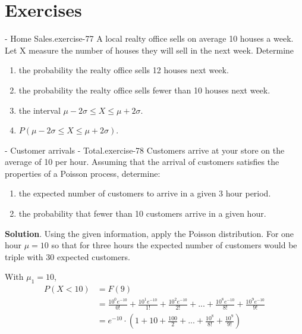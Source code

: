 \documentclass[10pt,]{book}
\numberwithin{equation}{section}
\newcommand{\lt}{<}
\begin{document}
\section[{Exercises}]{Exercises}\label{section-56}
\hypertarget{p-1162}{}%
\begin{inlineexercise}{- Home Sales.}{exercise-77}%
\hypertarget{p-1163}{}%
A local realty office sells on average 10 houses a week.  Let X measure the number of houses they will sell in the next week.  Determine \leavevmode%
\begin{enumerate}
\item\hypertarget{li-296}{}the probability the realty office sells 12 houses next week.%
\item\hypertarget{li-297}{}the probability the realty office sells fewer than 10 houses next week.%
\item\hypertarget{li-298}{}the interval \(\mu - 2\sigma \le X \le \mu + 2\sigma\).%
\item\hypertarget{li-299}{}\(P(\mu - 2\sigma \le X \le \mu + 2\sigma)\).%
\end{enumerate}
%
\end{inlineexercise}
%
\par
\hypertarget{p-1164}{}%
\begin{inlineexercise}{- Customer arrivals - Total.}{exercise-78}%
\hypertarget{p-1165}{}%
Customers arrive at your store on the average of 10 per hour.  Assuming that the arrival of customers satisfies the properties of a Poisson process, determine: \leavevmode%
\begin{enumerate}
\item\hypertarget{li-300}{}the expected number of customers to arrive in a given 3 hour period.%
\item\hypertarget{li-301}{}the probability that fewer than 10 customers arrive in a given hour.%
\end{enumerate}
 \textbf{Solution}.\quad%
\hypertarget{p-1166}{}%
Using the given information, apply the Poisson distribution.  For one hour \(\mu = 10\) so that for three hours the expected number of customers would be triple with 30 expected customers.%
\par
\hypertarget{p-1167}{}%
With \(\mu_1 = 10\),%
\begin{align*}
P(X \lt 10) & = F(9)\\
& = \frac{10^0 e^{-10}}{0!} + \frac{10^1 e^{-10}}{1!} + \frac{10^2 e^{-10}}{2!} + ... + \frac{10^8 e^{-10}}{8!} + \frac{10^9 e^{-10}}{9!}\\
& = e^{-10} \cdot ( 1 + 10 + \frac{100}{2} + ... + \frac{10^8}{8!} + \frac{10^9}{9!} )
\end{align*}
%
%
\end{inlineexercise}
\end{document}
